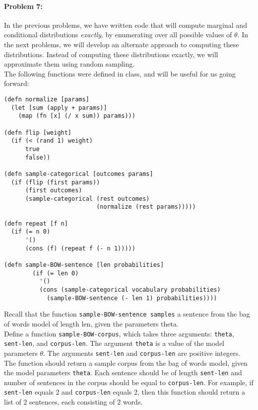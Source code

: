 \documentclass[10pt]{article}
\begin{document}
\hrulefill
\paragraph{Problem 7:}

In the previous problems, we have written code that will compute
marginal and conditional distributions \emph{exactly}, by enumerating
over all possible values of $\theta$. In the next problems, we will
develop an alternate approach to computing these
distributions. Instead of computing these distributions exactly, we
will approximate them using random sampling.
\\

\noindent The following functions were defined in class, and will be
useful for us going forward:

\begin{lstlisting}
(defn normalize [params]
  (let [sum (apply + params)]
    (map (fn [x] (/ x sum)) params)))

(defn flip [weight]
  (if (< (rand 1) weight)
      true
      false))

(defn sample-categorical [outcomes params]
  (if (flip (first params))
      (first outcomes)
      (sample-categorical (rest outcomes) 
                          (normalize (rest params)))))

(defn repeat [f n]
  (if (= n 0)
      '()
      (cons (f) (repeat f (- n 1)))))

(defn sample-BOW-sentence [len probabilities]
        (if (= len 0)
          '()
          (cons (sample-categorical vocabulary probabilities)
            (sample-BOW-sentence (- len 1) probabilities))))
\end{lstlisting}

\noindent Recall that the function \texttt{sample-BOW-sentence
  samples} a sentence from the bag of words model of length len, given
the parameters theta.
\\

\noindent Define a function \texttt{sample-BOW-corpus}, which takes
three arguments: \texttt{theta}, \texttt{sent-len}, and
\texttt{corpus-len}. The argument \texttt{theta} is a value of the
model parameters $\theta$. The arguments \texttt{sent-len} and
\texttt{corpus-len} are positive integers. The function should return
a sample corpus from the bag of words model, given the model
parameters \texttt{theta}. Each sentence should be of length
\texttt{sent-len} and number of sentences in the corpus should be
equal to \texttt{corpus-len}. For example, if \texttt{sent-len} equals
2 and \texttt{corpus-len} equals 2, then this function should return a
list of 2 sentences, each consisting of 2 words.
\\
\end{document}
